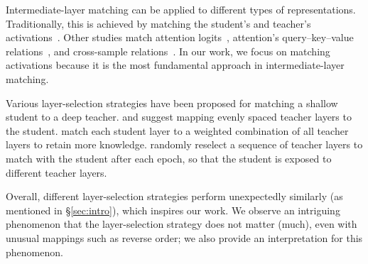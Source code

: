Intermediate-layer matching can be applied to different types of representations.  Traditionally, this is achieved by matching the student's and teacher's activations~\cite{patientkd, distilBERT}. Other studies match attention logits~\cite{tinybert}, attention's query--key--value relations~\cite{minilmv2}, and cross-sample relations~\cite{rkd, fcd}. In our work, we focus on matching activations because it is the most fundamental approach in intermediate-layer matching. 

Various layer-selection strategies have been proposed for matching a shallow student to a deep teacher. \citet{patientkd} and \citet{tinybert} suggest mapping evenly spaced teacher layers to the student. \citet{alpkd} match each student layer to
 a weighted combination of all teacher layers to retain more knowledge. \citet{railkd} randomly reselect a sequence of teacher layers to match with the student after each epoch, so that the student is exposed to different teacher layers.

Overall, different layer-selection strategies perform unexpectedly similarly (as mentioned in \S\ref{sec:intro}), which inspires our work. We observe an intriguing phenomenon that the layer-selection strategy does not matter (much), even with unusual mappings such as reverse order; we also provide an interpretation for this phenomenon. 

